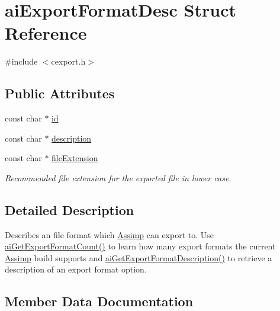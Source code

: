 \hypertarget{structai_export_format_desc}{}\section{ai\+Export\+Format\+Desc Struct Reference}
\label{structai_export_format_desc}


{\ttfamily \#include $<$cexport.\+h$>$}

\subsection*{Public Attributes}
\begin{DoxyCompactItemize}
\item 
const char $\ast$ \hyperlink{structai_export_format_desc_afe216eaea3a04abca041e5c253f94bbf}{id}
\item 
const char $\ast$ \hyperlink{structai_export_format_desc_a9c84c4b07c5177fb6539b9bdf90236fb}{description}
\item 
const char $\ast$ \hyperlink{structai_export_format_desc_a589d08d526f253176d09886787cd6b22}{file\+Extension}\hypertarget{structai_export_format_desc_a589d08d526f253176d09886787cd6b22}{}\label{structai_export_format_desc_a589d08d526f253176d09886787cd6b22}

\begin{DoxyCompactList}\small\item\em Recommended file extension for the exported file in lower case. \end{DoxyCompactList}\end{DoxyCompactItemize}


\subsection{Detailed Description}
Describes an file format which \hyperlink{namespace_assimp}{Assimp} can export to. Use \hyperlink{cexport_8h_a59cfffbc5b436da8ed8542108102b502}{ai\+Get\+Export\+Format\+Count()} to learn how many export formats the current \hyperlink{namespace_assimp}{Assimp} build supports and \hyperlink{cexport_8h_adda7f2e6611f719af6c8a4a0bef0a0a2}{ai\+Get\+Export\+Format\+Description()} to retrieve a description of an export format option. 

\subsection{Member Data Documentation}
